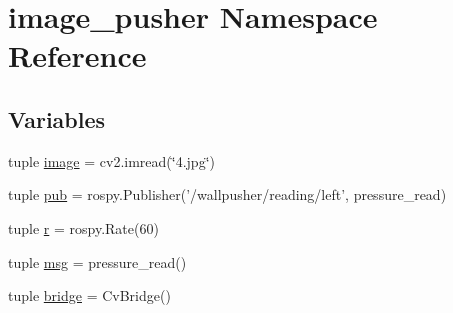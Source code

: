 \hypertarget{namespaceimage__pusher}{\section{image\-\_\-pusher Namespace Reference}
\label{namespaceimage__pusher}
}
\subsection*{Variables}
\begin{DoxyCompactItemize}
\item 
tuple \hyperlink{namespaceimage__pusher_ad375c9c3ddd05d32812d3253b62e917e}{image} = cv2.\-imread(\char`\"{}4.jpg\char`\"{})
\item 
tuple \hyperlink{namespaceimage__pusher_a1e85e2d0766ab8425d767cecd38521b5}{pub} = rospy.\-Publisher('/wallpusher/reading/left', pressure\-\_\-read)
\item 
tuple \hyperlink{namespaceimage__pusher_a3310000918e26e069c4618cfdf9f0b6c}{r} = rospy.\-Rate(60)
\item 
tuple \hyperlink{namespaceimage__pusher_a7cfbf1860db6dc5c963a9f40e6d9e1ab}{msg} = pressure\-\_\-read()
\item 
tuple \hyperlink{namespaceimage__pusher_ad4ee010cfc610094085b814056c62857}{bridge} = Cv\-Bridge()
\end{DoxyCompactItemize}



